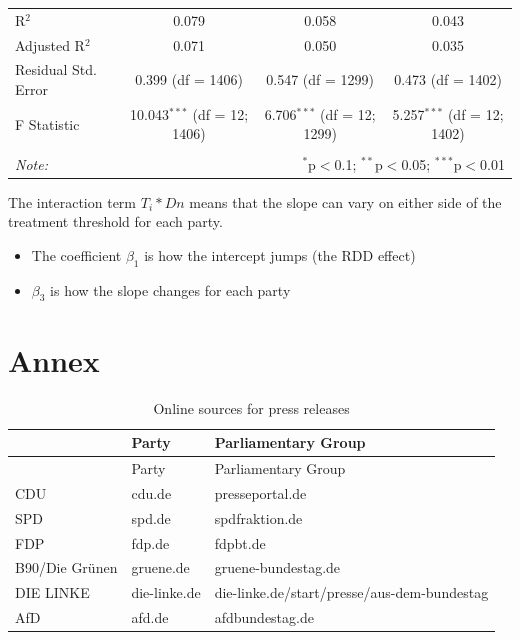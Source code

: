 \documentclass[
]{article}
\providecommand{\tightlist}{%
  \setlength{\itemsep}{0pt}\setlength{\parskip}{0pt}}
\begin{document}
\begin{table}[!htbp]
\begin{tabular}{@{\extracolsep{5pt}}lccc}
R$^{2}$ & 0.079 & 0.058 & 0.043 \\ 
Adjusted R$^{2}$ & 0.071 & 0.050 & 0.035 \\ 
Residual Std. Error & 0.399 (df = 1406) & 0.547 (df = 1299) & 0.473 (df = 1402) \\ 
F Statistic & 10.043$^{***}$ (df = 12; 1406) & 6.706$^{***}$ (df = 12; 1299) & 5.257$^{***}$ (df = 12; 1402) \\ 
\hline 
\hline \\[-1.8ex] 
\textit{Note:}  & \multicolumn{3}{r}{$^{*}$p$<$0.1; $^{**}$p$<$0.05; $^{***}$p$<$0.01} \\ 
\end{tabular} 
\end{table}

The interaction term \(T_i*Dn\) means that the slope can vary on either
side of the treatment threshold for each party.

\begin{itemize}
\tightlist
\item
  The coefficient \(\beta_1\) is how the intercept jumps (the RDD
  effect)
\item
  \(\beta_3\) is how the slope changes for each party
\end{itemize}

\hypertarget{annex}{%
\section{Annex}\label{annex}}

\begin{longtable}[]{@{}lll@{}}
\caption{Online sources for press releases
\label{table:press_releases_sources}}\tabularnewline
\toprule
& Party & Parliamentary Group\tabularnewline
\midrule
\endfirsthead
\toprule
& Party & Parliamentary Group\tabularnewline
\midrule
\endhead
CDU & cdu.de & presseportal.de\tabularnewline
SPD & spd.de & spdfraktion.de\tabularnewline
FDP & fdp.de & fdpbt.de\tabularnewline
B90/Die Grünen & gruene.de & gruene-bundestag.de\tabularnewline
DIE LINKE & die-linke.de &
die-linke.de/start/presse/aus-dem-bundestag\tabularnewline
AfD & afd.de & afdbundestag.de\tabularnewline
\bottomrule
\end{longtable}
\end{document}
